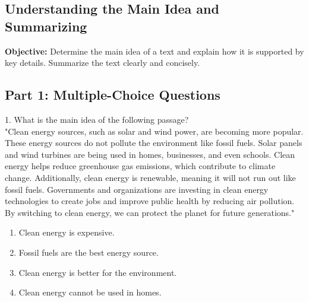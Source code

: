 \documentclass[12pt]{article}
\begin{document}
\subsection*{Understanding the Main Idea and Summarizing}
\onehalfspacing

\begin{tcolorbox}[colframe=black!40, colback=gray!0, title=Learning Objective]
\textbf{Objective:} Determine the main idea of a text and explain how it is supported by key details. Summarize the text clearly and concisely.
\end{tcolorbox}

\subsection*{Part 1: Multiple-Choice Questions}

1. What is the main idea of the following passage?\\
"Clean energy sources, such as solar and wind power, are becoming more popular. These energy sources do not pollute the environment like fossil fuels. Solar panels and wind turbines are being used in homes, businesses, and even schools. Clean energy helps reduce greenhouse gas emissions, which contribute to climate change. Additionally, clean energy is renewable, meaning it will not run out like fossil fuels. Governments and organizations are investing in clean energy technologies to create jobs and improve public health by reducing air pollution. By switching to clean energy, we can protect the planet for future generations."\\
\begin{enumerate}[label=\Alph*.]
    \item Clean energy is expensive.  
    \item Fossil fuels are the best energy source.  
    \item Clean energy is better for the environment.  
    \item Clean energy cannot be used in homes.  
\end{enumerate}

\vspace{1em}
\end{document}
